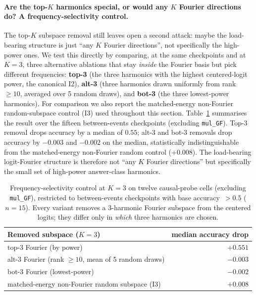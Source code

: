 \documentclass{article}
\begin{document}
\paragraph{Are the top-$K$ harmonics special, or would any $K$ Fourier directions do? A frequency-selectivity control.}
The top-$K$ subspace removal still leaves open a second attack: maybe
the load-bearing structure is just ``any $K$ Fourier directions'',
not specifically the high-power ones. We test this directly by
comparing, at the same checkpoints and at $K{=}3$, three alternative
ablations that stay \emph{inside} the Fourier basis but pick
different frequencies:
\textbf{top-3} (the three harmonics with the highest centered-logit
power, the canonical I2),
\textbf{alt-3} (three harmonics drawn uniformly from rank
$\geq 10$, averaged over 5 random draws), and
\textbf{bot-3} (the three lowest-power harmonics).
For comparison we also report the matched-energy non-Fourier
random-subspace control (I3) used throughout this section.
Table~\ref{tab:freq_selectivity} summarises the result over the
fifteen between-events checkpoints (excluding \texttt{mul\_GF}).
Top-3 removal drops accuracy by a median of $0.55$; alt-3 and
bot-3 removals drop accuracy by $-0.003$ and $-0.002$ on the
median, statistically indistinguishable from the matched-energy
non-Fourier random control ($+0.008$).
The load-bearing logit-Fourier structure is therefore not ``any
$K$ Fourier directions'' but specifically the small set of
high-power answer-class harmonics.

\begin{table}[!ht]
  \centering
  \small
  \caption{Frequency-selectivity control at $K{=}3$ on twelve
    causal-probe cells (excluding \texttt{mul\_GF}), restricted to
    between-events checkpoints with base accuracy~$>0.5$ ($n{=}15$).
    Every variant removes a 3-harmonic Fourier subspace from the
    centered logits; they differ only in \emph{which} three
    harmonics are chosen.}
  \label{tab:freq_selectivity}
  \begin{tabular}{lr}
    \toprule
    Removed subspace ($K{=}3$) & median accuracy drop \\
    \midrule
    top-3 Fourier (by power) & $+0.551$ \\
    alt-3 Fourier (rank $\geq 10$, mean of 5 random draws) & $-0.003$ \\
    bot-3 Fourier (lowest-power) & $-0.002$ \\
    matched-energy non-Fourier random subspace (I3) & $+0.008$ \\
    \bottomrule
  \end{tabular}
\end{table}
\end{document}
